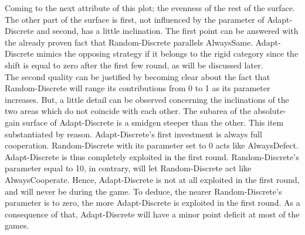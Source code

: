 \documentclass{article}
\begin{document}
	Coming to the next attribute of this plot; the evenness of the rest of the surface.
	The other part of the surface is first, not influenced by the parameter of Adapt-Discrete and second, has a little inclination.
	The first point can be answered with the already proven fact that Random-Discrete parallels AlwaysSame.
	Adapt-Discrete mimics the opposing strategy if it belongs to the rigid category since the shift is equal to zero after the first few round, as will be discussed later.%
	\\
	The second quality can be justified by becoming clear about the fact that Random-Discrete will range its contributions from 0 to 1 as its parameter increases.
	But, a little detail can be observed concerning the inclinations of the two areas which do not coincide with each other.
	The subarea of the absolute-gain surface of Adapt-Discrete is a smidgen steeper than the other.
	This item substantiated by reason.
	Adapt-Discrete's first investment is always full cooperation.
	Random-Discrete with its parameter set to 0 acts like AlwaysDefect.
	Adapt-Discrete is thus completely exploited in the first round.
	Random-Discrete's parameter equal to 10, in contrary, will let Random-Discrete act like AlwaysCooperate.
	Hence, Adapt-Discrete is not at all exploited in the first round, and will never be during the game.
	To deduce, the nearer Random-Discrete's parameter is to zero, the more Adapt-Discrete is exploited in the first round.
	As a consequence of that, Adapt-Discrete will have a minor point deficit at most of the games.
\end{document}
